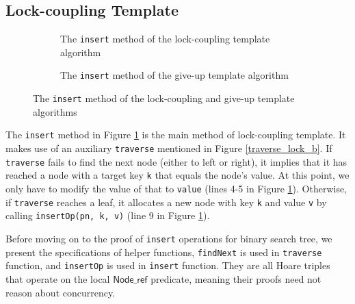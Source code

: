 \documentclass[a4paper,UKenglish,cleveref, autoref, thm-restate]{lipics-v2021}
\newcommand{\nodeboxrep}{\ensuremath{\mathsf{Node\_ref}}}
\begin{document}
\subsection{Lock-coupling Template}
\begin{figure}[h]
	\begin{subfigure}[t]{0.48\textwidth}
	 
	\caption{The \lstinline{insert} method of the lock-coupling template algorithm}
	\label{insert_lock}	
	\end{subfigure}\qquad
    \begin{subfigure}[t]{0.48\textwidth}
     
    \caption{The \lstinline{insert} method of the give-up template algorithm}
    \label{insert_giveup}
    \end{subfigure} 
\caption{The \lstinline{insert} method of the lock-coupling and give-up template algorithms}
\label{insert_lock_giveup} 
\end{figure}

The \texttt{insert} method in Figure \ref{insert_lock} is the main method of lock-coupling template. It makes use of an auxiliary \texttt{traverse}  mentioned in Figure \ref{traverse_lock_b}. If \texttt{traverse} fails to find the next node (either to left or right), it implies that it has reached a node with a target key \texttt{k} that equals the node's value. At this point, we only have to modify the value of that to \texttt{value} (lines 4-5 in Figure \ref{insert_lock}). Otherwise, if \texttt{traverse} reaches a leaf, it allocates a new node with key \texttt{k} and value \texttt{v} by calling \texttt{insertOp(pn, k, v)} (line 9 in Figure \ref{insert_lock}).

Before moving on to the proof of \texttt{insert} operations for binary search tree, we present the specifications of helper functions, \texttt{findNext} is used in \texttt{traverse} function, and \texttt{insertOp} is used in \texttt{insert} function. They are all Hoare triples that operate on the local $\nodeboxrep$ predicate, meaning their proofs need not reason about concurrency.
\end{document}

